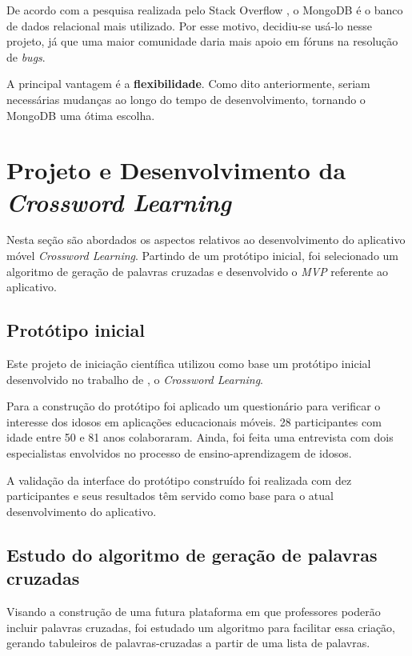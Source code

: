 De acordo com a pesquisa realizada pelo Stack Overflow \citep{stackoverflowmongo}, o MongoDB é o banco de dados relacional mais utilizado. Por esse motivo, decidiu-se usá-lo nesse projeto, já que uma maior comunidade daria mais apoio em fóruns na resolução de \textit{bugs}.

A principal vantagem é a \textbf{flexibilidade}. Como dito anteriormente, seriam necessárias mudanças ao longo do tempo de desenvolvimento, tornando o MongoDB uma ótima escolha.

\section{Projeto e Desenvolvimento da \textit{Crossword Learning}}
Nesta seção são abordados os aspectos relativos ao desenvolvimento do aplicativo móvel \textit{Crossword Learning}. Partindo de um protótipo inicial, foi selecionado um algoritmo de geração de palavras cruzadas e desenvolvido o \textit{MVP} referente ao aplicativo.

\subsection{Protótipo inicial}
\label{subsec:prototipoInicial}
Este projeto de iniciação científica utilizou como base um protótipo inicial desenvolvido no trabalho de \cite{oliveira2018crossword}, o \textit{Crossword Learning}.

Para a construção do protótipo foi aplicado um questionário para verificar o interesse dos idosos em aplicações educacionais móveis. 28 participantes com idade entre 50 e 81 anos colaboraram. Ainda, foi feita uma entrevista com dois especialistas envolvidos no processo de ensino-aprendizagem de idosos.

A validação da interface do protótipo construído foi realizada com dez participantes e seus resultados têm servido como base para o atual desenvolvimento do aplicativo. 


\subsection{Estudo do algoritmo de geração de palavras cruzadas}
Visando a construção de uma futura plataforma em que professores poderão incluir palavras cruzadas, foi estudado um algoritmo para facilitar essa criação, gerando tabuleiros de palavras-cruzadas a partir de uma lista de palavras.

